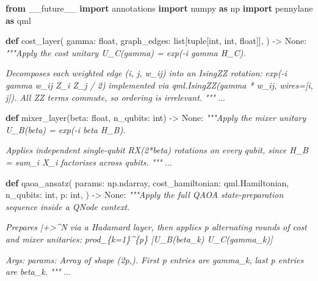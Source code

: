 \documentclass[
  11pt,
]{report}
\newenvironment{Shaded}{}{}
\newcommand{\BuiltInTok}[1]{\textcolor[rgb]{0.00,0.50,0.00}{#1}}
\newcommand{\CommentTok}[1]{\textcolor[rgb]{0.38,0.63,0.69}{\textit{#1}}}
\newcommand{\ImportTok}[1]{\textcolor[rgb]{0.00,0.50,0.00}{\textbf{#1}}}
\newcommand{\KeywordTok}[1]{\textcolor[rgb]{0.00,0.44,0.13}{\textbf{#1}}}
\newcommand{\NormalTok}[1]{#1}
\newcommand{\OperatorTok}[1]{\textcolor[rgb]{0.40,0.40,0.40}{#1}}
\newcommand{\VariableTok}[1]{\textcolor[rgb]{0.10,0.09,0.49}{#1}}
\begin{document}
\begin{Shaded}
\begin{Highlighting}[]
\ImportTok{from}\NormalTok{ \_\_future\_\_ }\ImportTok{import}\NormalTok{ annotations}
\ImportTok{import}\NormalTok{ numpy }\ImportTok{as}\NormalTok{ np}
\ImportTok{import}\NormalTok{ pennylane }\ImportTok{as}\NormalTok{ qml}


\KeywordTok{def}\NormalTok{ cost\_layer(}
\NormalTok{    gamma: }\BuiltInTok{float}\NormalTok{,}
\NormalTok{    graph\_edges: }\BuiltInTok{list}\NormalTok{[}\BuiltInTok{tuple}\NormalTok{[}\BuiltInTok{int}\NormalTok{, }\BuiltInTok{int}\NormalTok{, }\BuiltInTok{float}\NormalTok{]],}
\NormalTok{) }\OperatorTok{{-}\textgreater{}} \VariableTok{None}\NormalTok{:}
    \CommentTok{"""Apply the cost unitary U\_C(gamma) = exp({-}i gamma H\_C).}

\CommentTok{    Decomposes each weighted edge (i, j, w\_ij) into an IsingZZ rotation:}
\CommentTok{        exp({-}i gamma w\_ij Z\_i Z\_j / 2)}
\CommentTok{    implemented via qml.IsingZZ(gamma * w\_ij, wires=[i, j]).}
\CommentTok{    All ZZ terms commute, so ordering is irrelevant.}
\CommentTok{    """}
\NormalTok{    ...}


\KeywordTok{def}\NormalTok{ mixer\_layer(beta: }\BuiltInTok{float}\NormalTok{, n\_qubits: }\BuiltInTok{int}\NormalTok{) }\OperatorTok{{-}\textgreater{}} \VariableTok{None}\NormalTok{:}
    \CommentTok{"""Apply the mixer unitary U\_B(beta) = exp({-}i beta H\_B).}

\CommentTok{    Applies independent single{-}qubit RX(2*beta) rotations on every}
\CommentTok{    qubit, since H\_B = sum\_i X\_i factorises across qubits.}
\CommentTok{    """}
\NormalTok{    ...}


\KeywordTok{def}\NormalTok{ qaoa\_ansatz(}
\NormalTok{    params: np.ndarray,}
\NormalTok{    cost\_hamiltonian: qml.Hamiltonian,}
\NormalTok{    n\_qubits: }\BuiltInTok{int}\NormalTok{,}
\NormalTok{    p: }\BuiltInTok{int}\NormalTok{,}
\NormalTok{) }\OperatorTok{{-}\textgreater{}} \VariableTok{None}\NormalTok{:}
    \CommentTok{"""Apply the full QAOA state{-}preparation sequence inside a QNode context.}

\CommentTok{    Prepares |+\textgreater{}\^{}N via a Hadamard layer, then applies p alternating}
\CommentTok{    rounds of cost and mixer unitaries:}
\CommentTok{        prod\_\{k=1\}\^{}\{p\} [U\_B(beta\_k) U\_C(gamma\_k)]}

\CommentTok{    Args:}
\CommentTok{        params: Array of shape (2p,). First p entries are gamma\_k,}
\CommentTok{                last p entries are beta\_k.}
\CommentTok{    """}
\NormalTok{    ...}



\end{Highlighting}
\end{Shaded}
\end{document}

